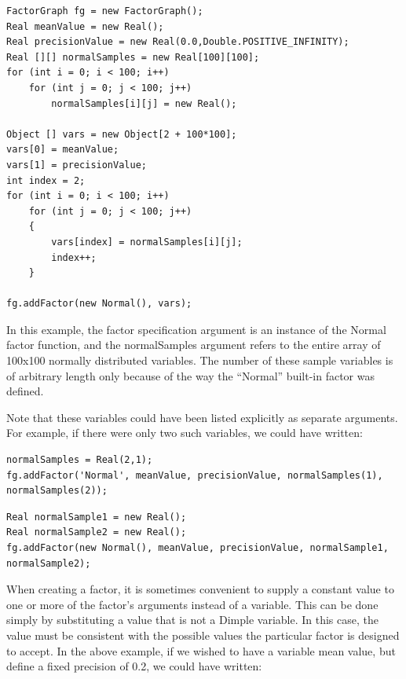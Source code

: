 \fi

\ifjava

\begin{lstlisting}
FactorGraph fg = new FactorGraph();
Real meanValue = new Real();
Real precisionValue = new Real(0.0,Double.POSITIVE_INFINITY);
Real [][] normalSamples = new Real[100][100];
for (int i = 0; i < 100; i++)
	for (int j = 0; j < 100; j++)
		normalSamples[i][j] = new Real();
		
Object [] vars = new Object[2 + 100*100];
vars[0] = meanValue;
vars[1] = precisionValue;
int index = 2;
for (int i = 0; i < 100; i++)
	for (int j = 0; j < 100; j++)
	{
		vars[index] = normalSamples[i][j];
		index++;
	}
		
fg.addFactor(new Normal(), vars);
\end{lstlisting}

In this example, the factor specification argument is an instance of the Normal factor function, and the normalSamples argument refers to the entire array of 100x100 normally distributed variables.  The number of these sample variables is of arbitrary length only because of the way the ``Normal'' built-in factor was defined.  

\fi

Note that these variables could have been listed explicitly as separate arguments.  For example, if there were only two such variables, we could have written:

\ifmatlab
\begin{lstlisting}
normalSamples = Real(2,1);
fg.addFactor('Normal', meanValue, precisionValue, normalSamples(1), normalSamples(2));
\end{lstlisting}
\fi

\ifjava
\begin{lstlisting}
Real normalSample1 = new Real();
Real normalSample2 = new Real();
fg.addFactor(new Normal(), meanValue, precisionValue, normalSample1, normalSample2);
\end{lstlisting}
\fi

When creating a factor, it is sometimes convenient to supply a constant value to one or more of the factor's arguments instead of a variable.  This can be done simply by substituting a value that is not a Dimple variable.  In this case, the value must be consistent with the possible values the particular factor is designed to accept.  In the above example, if we wished to have a variable mean value, but define a fixed precision of 0.2, we could have written:

\ifmatlab

